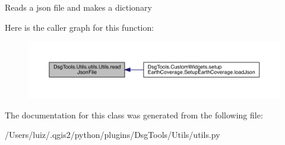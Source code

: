 \begin{DoxyVerb}Reads a json file and makes a dictionary
\end{DoxyVerb}
 Here is the caller graph for this function\+:
\nopagebreak
\begin{figure}[H]
\begin{center}
\leavevmode
\includegraphics[width=350pt]{class_dsg_tools_1_1_utils_1_1utils_1_1_utils_a6e911bdef39886b4f1056d746388294c_icgraph}
\end{center}
\end{figure}


The documentation for this class was generated from the following file\+:\begin{DoxyCompactItemize}
\item 
/\+Users/luiz/.\+qgis2/python/plugins/\+Dsg\+Tools/\+Utils/utils.\+py\end{DoxyCompactItemize}
